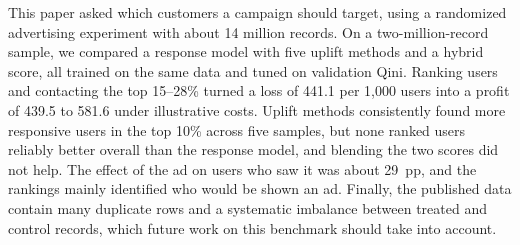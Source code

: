 \documentclass[conference]{IEEEtran}
\begin{document}
This paper asked which customers a campaign should target, using a
randomized advertising experiment with about 14 million records. On a
two-million-record sample, we compared a response model with five uplift
methods and a hybrid score, all trained on the same data and tuned on
validation Qini. Ranking users and contacting the top 15--28\% turned a
loss of 441.1 per 1,000 users into a profit of 439.5 to 581.6 under
illustrative costs. Uplift methods consistently found more responsive
users in the top 10\% across five samples, but none ranked users
reliably better overall than the response model, and blending the two
scores did not help. The effect of the ad on users who saw it was about
29~pp, and the rankings mainly identified who would be shown an ad.
Finally, the published data contain many duplicate rows and a
systematic imbalance between treated and control records, which future
work on this benchmark should take into account.
\end{document}
